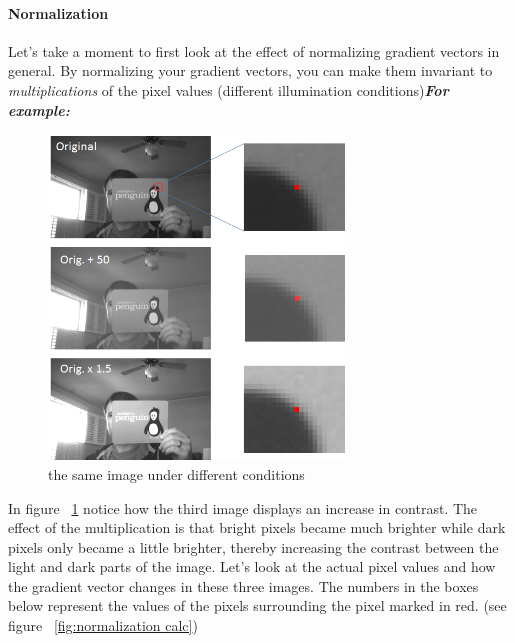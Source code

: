 \paragraph{}
\paragraph{Normalization}Let’s take a moment to first look at the effect of normalizing gradient vectors in general.
\newpage By normalizing your gradient vectors, you can make them invariant to \textit{multiplications} of the pixel values (different illumination conditions)\newline \newline \textbf{\textit{For example:}} \newline
\begin{figure}
	\centering
	\includegraphics[width=0.70\textwidth]{normalization_ex.png}
	\caption{the same image under different conditions}
	\label{fig:normalization}
\end{figure}
In figure ~\ref{fig:normalization} notice how the third image displays an increase in contrast. \newline
The effect of the multiplication is that bright pixels became much brighter while dark pixels only became a little brighter, thereby increasing the contrast between the light and dark parts of the image. 
\newline \newline Let’s look at the actual pixel values and how the gradient vector changes in these three images. \newline The numbers in the boxes below represent the values of the pixels surrounding the pixel marked in red. (see figure ~\ref{fig:normalization calc})
